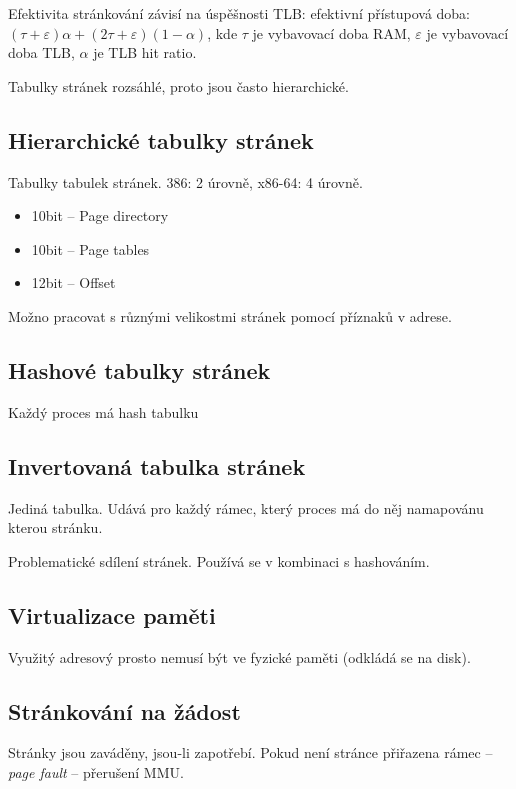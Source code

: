 \documentclass[a4paper, 11pt]{report}
\begin{document}
Efektivita stránkování závisí na úspěšnosti TLB: efektivní přístupová doba: $(\tau + \varepsilon)\alpha + (2\tau + \varepsilon)(1-\alpha)$, kde $\tau$ je vybavovací doba RAM, $\varepsilon$ je vybavovací doba TLB, $\alpha$ je TLB hit ratio.

Tabulky stránek rozsáhlé, proto jsou často hierarchické.

\subsection{Hierarchické tabulky stránek}

Tabulky tabulek stránek. 386: 2 úrovně, x86-64: 4 úrovně.
\begin{itemize}
	\item 10bit -- Page directory
	\item 10bit -- Page tables
	\item 12bit -- Offset
\end{itemize}

Možno pracovat s různými velikostmi stránek pomocí příznaků v adrese.

\subsection{Hashové tabulky stránek}

Každý proces má hash tabulku

\subsection{Invertovaná tabulka stránek}

Jediná tabulka. Udává pro každý rámec, který proces má do něj namapovánu kterou stránku.

Problematické sdílení stránek. Používá se v kombinaci s hashováním.

\subsection{Virtualizace paměti}

Využitý adresový prosto nemusí být ve fyzické paměti (odkládá se na disk).

\subsection{Stránkování na žádost}

Stránky jsou zaváděny, jsou-li zapotřebí. Pokud není stránce přiřazena rámec -- \emph{page fault} -- přerušení MMU.
\end{document}
